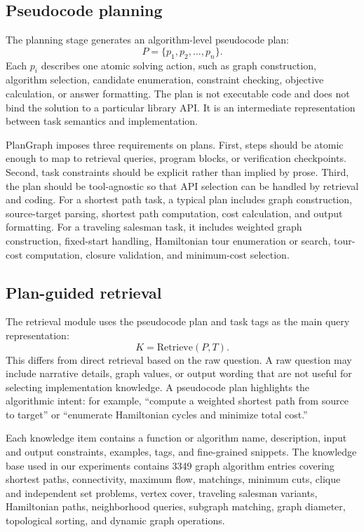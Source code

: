 \documentclass[pdflatex,sn-mathphys-num]{sn-jnl}
\theoremstyle{thmstyleone}
\theoremstyle{thmstyletwo}
\theoremstyle{thmstylethree}
\begin{document}
\subsection{Pseudocode planning}

The planning stage generates an algorithm-level pseudocode plan:
\begin{equation}
P=\{p_1,p_2,\ldots,p_n\}.
\end{equation}
Each $p_i$ describes one atomic solving action, such as graph construction, algorithm selection, candidate enumeration, constraint checking, objective calculation, or answer formatting. The plan is not executable code and does not bind the solution to a particular library API. It is an intermediate representation between task semantics and implementation.

PlanGraph imposes three requirements on plans. First, steps should be atomic enough to map to retrieval queries, program blocks, or verification checkpoints. Second, task constraints should be explicit rather than implied by prose. Third, the plan should be tool-agnostic so that API selection can be handled by retrieval and coding. For a shortest path task, a typical plan includes graph construction, source-target parsing, shortest path computation, cost calculation, and output formatting. For a traveling salesman task, it includes weighted graph construction, fixed-start handling, Hamiltonian tour enumeration or search, tour-cost computation, closure validation, and minimum-cost selection.

\subsection{Plan-guided retrieval}

The retrieval module uses the pseudocode plan and task tags as the main query representation:
\begin{equation}
K=\mathrm{Retrieve}(P,T).
\end{equation}
This differs from direct retrieval based on the raw question. A raw question may include narrative details, graph values, or output wording that are not useful for selecting implementation knowledge. A pseudocode plan highlights the algorithmic intent: for example, ``compute a weighted shortest path from source to target'' or ``enumerate Hamiltonian cycles and minimize total cost.''

Each knowledge item contains a function or algorithm name, description, input and output constraints, examples, tags, and fine-grained snippets. The knowledge base used in our experiments contains 3349 graph algorithm entries covering shortest paths, connectivity, maximum flow, matchings, minimum cuts, clique and independent set problems, vertex cover, traveling salesman variants, Hamiltonian paths, neighborhood queries, subgraph matching, graph diameter, topological sorting, and dynamic graph operations.
\end{document}
